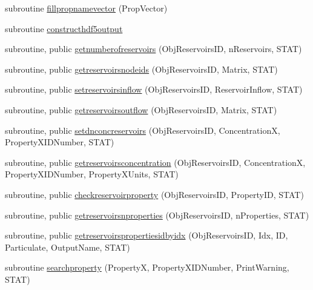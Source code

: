 \begin{DoxyCompactItemize}
\item 
subroutine \mbox{\hyperlink{namespacemodulereservoirs_a4297360b11f2cc348b2bb6524d4307b9}{fillpropnamevector}} (Prop\+Vector)
\item 
subroutine \mbox{\hyperlink{namespacemodulereservoirs_aa1585e14b10abec0e0a86d6b4674be9c}{constructhdf5output}}
\item 
subroutine, public \mbox{\hyperlink{namespacemodulereservoirs_a6c97c189244107e76016a8e045715d94}{getnumberofreservoirs}} (Obj\+Reservoirs\+ID, n\+Reservoirs, S\+T\+AT)
\item 
subroutine, public \mbox{\hyperlink{namespacemodulereservoirs_a1af4820153560697135a4b5289ffefb9}{getreservoirsnodeids}} (Obj\+Reservoirs\+ID, Matrix, S\+T\+AT)
\item 
subroutine, public \mbox{\hyperlink{namespacemodulereservoirs_af7840621e7e8765fc75f7a8c81f0b054}{setreservoirsinflow}} (Obj\+Reservoirs\+ID, Reservoir\+Inflow, S\+T\+AT)
\item 
subroutine, public \mbox{\hyperlink{namespacemodulereservoirs_a92177000a842b34a96a2edc6b49e3128}{getreservoirsoutflow}} (Obj\+Reservoirs\+ID, Matrix, S\+T\+AT)
\item 
subroutine, public \mbox{\hyperlink{namespacemodulereservoirs_a947f8bf80536f49287e59c0f5d008f17}{setdnconcreservoirs}} (Obj\+Reservoirs\+ID, ConcentrationX, Property\+X\+I\+D\+Number, S\+T\+AT)
\item 
subroutine, public \mbox{\hyperlink{namespacemodulereservoirs_af97fb114c425ea04bf826d452e6d075f}{getreservoirsconcentration}} (Obj\+Reservoirs\+ID, ConcentrationX, Property\+X\+I\+D\+Number, Property\+X\+Units, S\+T\+AT)
\item 
subroutine, public \mbox{\hyperlink{namespacemodulereservoirs_ae639ba85f34ad23b758837c7842e91ed}{checkreservoirproperty}} (Obj\+Reservoirs\+ID, Property\+ID, S\+T\+AT)
\item 
subroutine, public \mbox{\hyperlink{namespacemodulereservoirs_a53b63e6050bd055646e8d248c77b9d39}{getreservoirsnproperties}} (Obj\+Reservoirs\+ID, n\+Properties, S\+T\+AT)
\item 
subroutine, public \mbox{\hyperlink{namespacemodulereservoirs_ac84a64521bf81b419760543bd55c1439}{getreservoirspropertiesidbyidx}} (Obj\+Reservoirs\+ID, Idx, ID, Particulate, Output\+Name, S\+T\+AT)
\item 
subroutine \mbox{\hyperlink{namespacemodulereservoirs_ae21cb91c7b00a7c56ed8f0d763dd75a2}{searchproperty}} (PropertyX, Property\+X\+I\+D\+Number, Print\+Warning, S\+T\+AT)
\item 

\end{DoxyCompactItemize}
